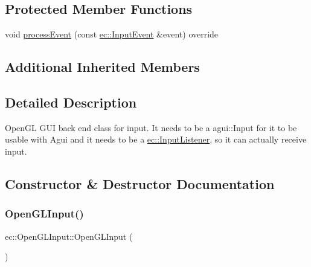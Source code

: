 \subsection*{Protected Member Functions}
\begin{DoxyCompactItemize}
\item 
void \mbox{\hyperlink{classec_1_1_open_g_l_input_a064a4e318e18d79ad8df19c789f84686}{process\+Event}} (const \mbox{\hyperlink{structec_1_1_input_event}{ec\+::\+Input\+Event}} \&event) override
\end{DoxyCompactItemize}
\subsection*{Additional Inherited Members}


\subsection{Detailed Description}
Open\+GL G\+UI back end class for input. It needs to be a agui\+::\+Input for it to be usable with Agui and it needs to be a \mbox{\hyperlink{classec_1_1_input_listener}{ec\+::\+Input\+Listener}}, so it can actually receive input. 

\subsection{Constructor \& Destructor Documentation}
\mbox{\label{classec_1_1_open_g_l_input_a7046406475d576873c287a64ea4d3cb6}} 
\subsubsection{\texorpdfstring{Open\+G\+L\+Input()}{OpenGLInput()}}
{\footnotesize\ttfamily ec\+::\+Open\+G\+L\+Input\+::\+Open\+G\+L\+Input (\begin{DoxyParamCaption}{ }\end{DoxyParamCaption})\hspace{0.3cm}{\ttfamily [explicit]}}

\mbox{\label{classec_1_1_open_g_l_input_ab4a3fa6d2e349d8dbf4de8b50a7a81ae}} 
